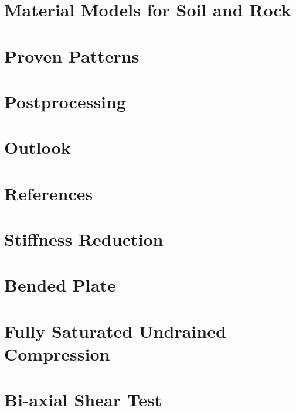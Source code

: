 \documentclass[12pt,a4paper]{report}
\begin{document}
\chapter{Material Models for Soil and Rock}
\label{chap:materials}


\chapter{Proven Patterns}
\label{chap:patterns}


\chapter{Postprocessing}
\label{chap:postprocessing}


\chapter{Outlook}
\label{chap:outlook}


\chapter{References}
\label{chap:references}


\begin{appendices}

    \chapter{Stiffness Reduction}
    \label{app:stiffness-reduction}
    

    \chapter{Bended Plate}
    \label{app:bended-plate}
    

    \chapter{Fully Saturated Undrained Compression}
    \label{app:fully-saturated-undrained-compression}
    

    \chapter{Bi-axial Shear Test}
    \label{app:bi-axial-shear}
    

\end{appendices}
\end{document}
